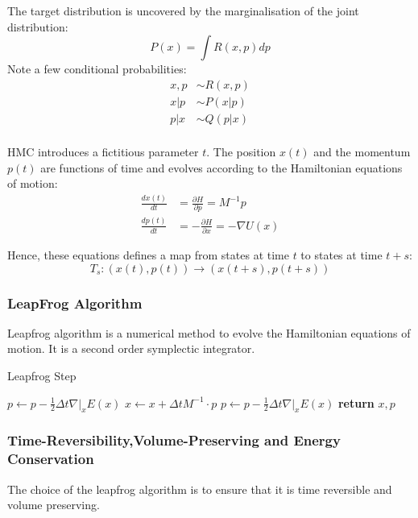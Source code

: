 \documentclass[12pt,a4paper]{article}
\begin{document}
The target distribution is uncovered by the marginalisation of the joint distribution: 
$$
    P(x) = \int R(x,p) dp
$$
Note a few conditional probabilities:
\begin{align*}
    x,p &\sim R(x,p)\\
    x|p &\sim P(x|p)\\
    p|x &\sim Q(p|x)\\
\end{align*}

HMC introduces a fictitious parameter $t$. The position $x(t)$ and the momentum $p(t)$ are functions of time and evolves according to the Hamiltonian equations of motion:
\begin{align*}
    \frac{dx(t)}{dt} &= \frac{\partial H}{\partial p} = M^{-1}p\\
    \frac{dp(t)}{dt} &= -\frac{\partial H}{\partial x} = -\nabla U(x)
\end{align*}

Hence, these equations defines a map from states at time $t$ to states at time $t+s$:
$$
    T_s : (x(t),p(t)) \rightarrow (x(t+s),p(t+s))
$$

\subsubsection{LeapFrog Algorithm}
Leapfrog algorithm is a numerical method to evolve the Hamiltonian equations of motion. It is a second order symplectic integrator.\\

\begin{algorithm}
\caption{Leapfrog Step}
\begin{algorithmic}[1]
    \State $p \gets p - \frac{1}{2} \Delta t \nabla|_x E(x)$ 
    \State $x \gets x + \Delta t M^{-1} \cdot p$ 
    \State $p \gets p - \frac{1}{2} \Delta t \nabla|_x E(x)$ 
    \State \textbf{return} $x, p$
\EndProcedure
\end{algorithmic}
\end{algorithm}

\subsubsection{Time-Reversibility,Volume-Preserving and Energy Conservation}
The choice of the leapfrog algorithm is to ensure that it is time reversible and volume preserving.\\
\end{document}
